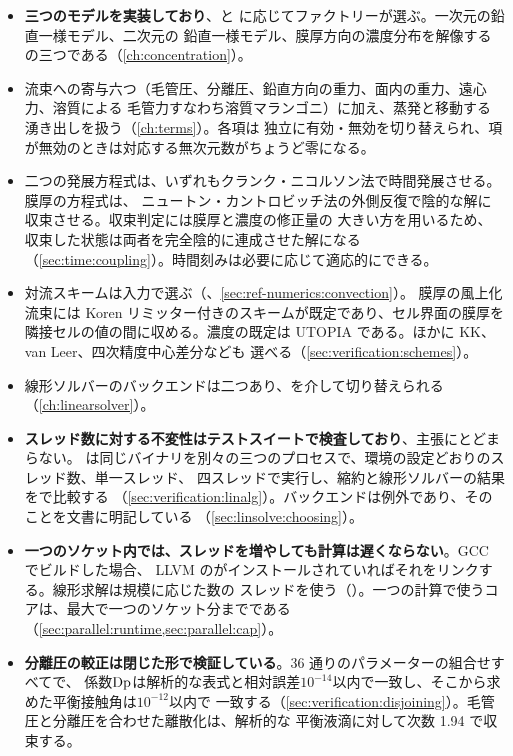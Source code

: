 \begin{itemize}
  \item \textbf{三つのモデルを実装しており}、と
    に応じてファクトリーが選ぶ。一次元の鉛直一様モデル、二次元の
    鉛直一様モデル、膜厚方向の濃度分布を解像するの三つである（\cref{ch:concentration}）。
  \item 流束への寄与六つ（毛管圧、分離圧、鉛直方向の重力、面内の重力、遠心力、溶質による
    毛管力すなわち溶質マランゴニ）に加え、蒸発と移動する湧き出しを扱う（\cref{ch:terms}）。各項は
    独立に有効・無効を切り替えられ、項が無効のときは対応する無次元数がちょうど零になる。
  \item 二つの発展方程式は、いずれもクランク・ニコルソン法で時間発展させる。膜厚の方程式は、
    ニュートン・カントロビッチ法の外側反復で陰的な解に収束させる。収束判定には膜厚と濃度の修正量の
    大きい方を用いるため、収束した状態は両者を完全陰的に連成させた解になる
    （\cref{sec:time:coupling}）。時間刻みは必要に応じて適応的にできる。
  \item 対流スキームは入力で選ぶ（、\cref{sec:ref-numerics:convection}）。
    膜厚の風上化流束には Koren リミッター付きのスキームが既定であり、セル界面の膜厚を
    隣接セルの値の間に収める。濃度の既定は UTOPIA である。ほかに KK、van Leer、四次精度中心差分なども
    選べる（\cref{sec:verification:schemes}）。
  \item 線形ソルバーのバックエンドは二つあり、を介して切り替えられる
    （\cref{ch:linearsolver}）。
  \item \textbf{スレッド数に対する不変性はテストスイートで検査しており}、主張にとどまらない。
    は同じバイナリを別々の三つのプロセスで、環境の設定どおりのスレッド数、単一スレッド、
    四スレッドで実行し、縮約と線形ソルバーの結果を\code{==}で比較する
    （\cref{sec:verification:linalg}）。バックエンドは例外であり、そのことを文書に明記している
    （\cref{sec:linsolve:choosing}）。
  \item \textbf{一つのソケット内では、スレッドを増やしても計算は遅くならない}。GCC でビルドした場合、
    LLVM のがインストールされていればそれをリンクする。線形求解は規模に応じた数の
    スレッドを使う（）。一つの計算で使うコアは、最大で一つのソケット分までである
    （\cref{sec:parallel:runtime,sec:parallel:cap}）。
  \item \textbf{分離圧の較正は閉じた形で検証している}。36 通りのパラメーターの組合せすべてで、
    係数$\mathrm{Dp}$は解析的な表式と相対誤差$10^{-14}$以内で一致し、そこから求めた平衡接触角は$10^{-12}$以内で
    一致する（\cref{sec:verification:disjoining}）。毛管圧と分離圧を合わせた離散化は、解析的な
    平衡液滴に対して次数 1.94 で収束する。
\end{itemize}

